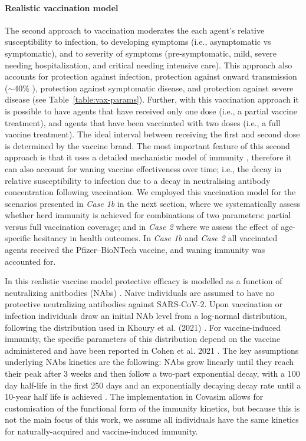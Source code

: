 \documentclass[article, a4, authoryear]{elsarticle}
\begin{document}
\paragraph{Realistic vaccination model} The second approach to vaccination  \cite{cohen2021mechanistic} moderates the each agent's relative susceptibility to infection, to developing symptoms (i.e., asymptomatic vs symptomatic), and to severity of symptoms (pre-symptomatic, mild, severe needing hospitalization, and critical needing intensive care). This approach also accounts for protection against infection, protection against onward transmission ($\sim40$\% \cite{harris2021effect, pruna2022onward}), protection against symptomatic disease, and protection against severe disease \cite{cohen2021mechanistic} (see Table~\ref{table:vax-params}). Further, with this vaccination approach it is possible to have agents that have received only one dose (i.e., a partial vaccine treatment), and agents that have been vaccinated with two doses (i.e., a full vaccine treatment). The ideal interval between receiving the first and second dose is determined by the vaccine brand. The most important feature of this second approach is that it uses a detailed mechanistic model of immunity \cite{cohen2021mechanistic}, therefore it can also account for waning vaccine effectiveness over time; i.e., the decay in relative susceptibility to infection due to a decay in neutralising antibody concentration following vaccination. We employed this vaccination model for the scenarios presented in \textit{Case 1b} in the next section, where we systematically assess whether herd immunity is achieved for combinations of two parameters: partial versus full vaccination coverage; and in \textit{Case 2} where we assess the effect of age-specific hesitancy in health outcomes. In \textit{Case 1b} and \textit{Case 2} all vaccinated agents received the Pfizer--BioNTech vaccine, and waning immunity was accounted for. 

In this realistic vaccine model \cite{cohen2021mechanistic} protective efficacy is modelled as a function of neutralizing anitbodies (NAbs) \cite{khoury2020measuring}. Naive individuals are assumed to have no protective neutralizing antibodies against SARS-CoV-2. Upon vaccination or infection individuals draw an initial NAb level from a log-normal distribution, following the distribution used in Khoury et al. (2021) \cite{khoury2020measuring}. For vaccine-induced immunity, the specific parameters of this distribution depend on the vaccine administered and have been reported in Cohen et al. 2021 \cite{cohen2021mechanistic}. The key assumptions underlying NAbs kinetics are the following: NAbs grow linearly until they reach their peak after 3 weeks and then follow a two-part exponential decay, with a 100 day half-life in the first 250 days and an exponentially decaying decay rate until a 10-year half life is achieved \cite{cohen2021mechanistic, khoury2020measuring}. The implementation in Covasim allows for customisation of the functional form of the immunity kinetics, but because this is not the main focus of this work, we assume all individuals have the same kinetics for naturally-acquired and vaccine-induced immunity.  
\end{document}
